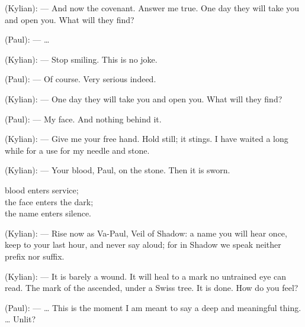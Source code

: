 \begin{room}
(Kylian): --- And now the covenant. Answer me true. One day they will take you and open you. What will they find?

(Paul): --- \ldots{}

(Kylian): --- Stop smiling. This is no joke.

(Paul): --- Of course. Very serious indeed.

(Kylian): --- One day they will take you and open you. What will they find?

(Paul): --- My face. And nothing behind it.

(Kylian): --- Give me your free hand. Hold still; it stings. I have waited a long while for a use for my needle and stone.

\centerline{}

(Kylian): --- Your blood, Paul, on the stone. Then it is sworn.

\begin{scripture}
blood enters service; \\
the face enters the dark; \\
the name enters silence.
\end{scripture}

(Kylian): --- Rise now as Va-Paul, Veil of Shadow: a name you will hear once, keep to your last hour, and never say aloud; for in Shadow we speak neither prefix nor suffix.

\centerline{}

(Kylian): --- It is barely a wound. It will heal to a mark no untrained eye can read. The mark of the ascended, under a Swiss tree. It is done. How do you feel?

(Paul): --- \ldots{} This is the moment I am meant to say a deep and meaningful thing. \ldots{} Unlit?

\centerline{}

\end{room}

